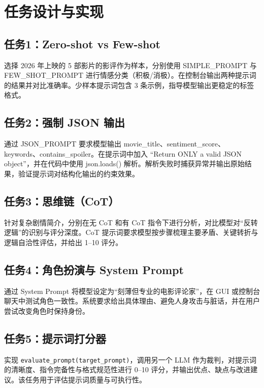\documentclass[UTF8, a4paper, 12pt]{ctexart}
\begin{document}
\section{任务设计与实现}


\subsection{任务1：Zero-shot vs Few-shot}

选择 2026 年上映的 5 部影片的影评作为样本，分别使用 SIMPLE\_PROMPT 与 FEW\_SHOT\_PROMPT 进行情感分类（积极/消极）。在控制台输出两种提示词的结果并对比准确率。少样本提示词包含 3 条示例，指导模型输出更稳定的标签格式。

\subsection{任务2：强制 JSON 输出}

通过 JSON\_PROMPT 要求模型输出 movie\_title、sentiment\_score、keywords、contains\_spoiler。在提示词中加入 “Return ONLY a valid JSON object”，并在代码中使用 json.loads() 解析。解析失败时捕获异常并输出原始结果，验证提示词对结构化输出的约束效果。

\subsection{任务3：思维链（CoT）}

针对复杂剧情简介，分别在无 CoT 和有 CoT 指令下进行分析，对比模型对“反转逻辑”的识别与评分深度。CoT 提示词要求模型按步骤梳理主要矛盾、关键转折与逻辑自洽性评估，并给出 1--10 评分。

\subsection{任务4：角色扮演与 System Prompt}

通过 System Prompt 将模型设定为“刻薄但专业的电影评论家”，在 GUI 或控制台聊天中测试角色一致性。系统要求给出具体理由、避免人身攻击与脏话，并在用户尝试改变角色时保持身份。

\subsection{任务5：提示词打分器}

实现 \texttt{evaluate\_prompt(target\_prompt)}，调用另一个 LLM 作为裁判，对提示词的清晰度、指令完备性与格式规范性进行 0--10 评分，并输出优点、缺点与改进建议。该任务用于评估提示词质量与可执行性。
\end{document}
